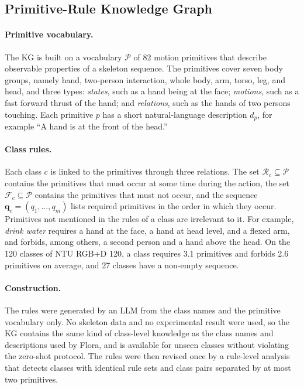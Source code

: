 \documentclass[11pt]{article}
\begin{document}
\subsection{Primitive-Rule Knowledge Graph}
\label{sec:kg}

\paragraph{Primitive vocabulary.}
The KG is built on a vocabulary $\mathcal{P}$ of 82 motion primitives that describe observable properties of a skeleton sequence. The primitives cover seven body groups, namely hand, two-person interaction, whole body, arm, torso, leg, and head, and three types: \emph{states}, such as a hand being at the face; \emph{motions}, such as a fast forward thrust of the hand; and \emph{relations}, such as the hands of two persons touching. Each primitive $p$ has a short natural-language description $d_p$, for example ``A hand is at the front of the head.''

\paragraph{Class rules.}
Each class $c$ is linked to the primitives through three relations. The set $\mathcal{R}_c \subseteq \mathcal{P}$ contains the primitives that must occur at some time during the action, the set $\mathcal{F}_c \subseteq \mathcal{P}$ contains the primitives that must not occur, and the sequence $\mathbf{q}_c = (q_1, \dots, q_m)$ lists required primitives in the order in which they occur. Primitives not mentioned in the rules of a class are irrelevant to it. For example, \emph{drink water} requires a hand at the face, a hand at head level, and a flexed arm, and forbids, among others, a second person and a hand above the head. On the 120 classes of NTU RGB+D 120, a class requires 3.1 primitives and forbids 2.6 primitives on average, and 27 classes have a non-empty sequence.

\paragraph{Construction.}
The rules were generated by an LLM from the class names and the primitive vocabulary only. No skeleton data and no experimental result were used, so the KG contains the same kind of class-level knowledge as the class names and descriptions used by Flora, and is available for unseen classes without violating the zero-shot protocol. The rules were then revised once by a rule-level analysis that detects classes with identical rule sets and class pairs separated by at most two primitives.
\end{document}
